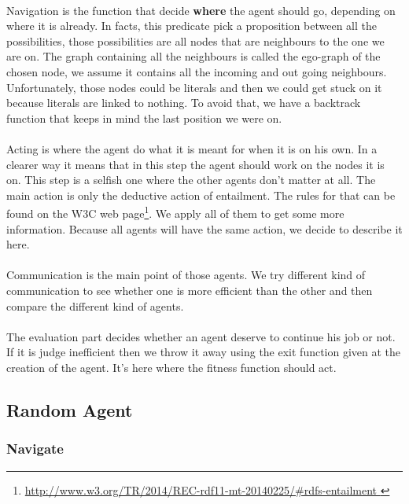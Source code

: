 \documentclass{article}
\begin{document}
		\paragraph{}
			Navigation is the function that decide \textbf{where} the agent should go, depending on where it is already.
			In facts, this predicate pick a proposition between all the possibilities,
			those possibilities are all nodes that are neighbours to the one we are on.
			The graph containing all the neighbours is called the ego-graph of the chosen node,
			we assume it contains all the incoming and out going neighbours.
			Unfortunately, those nodes could be literals and then we could get stuck on it because literals are linked to nothing.
			To avoid that, we have a backtrack function that keeps in mind the last position we were on.
		\paragraph{}
			Acting is where the agent do what it is meant for when it is on his own.
			In a clearer way it means that in this step the agent should work on the nodes it is on.
			This step is a selfish one where the other agents don't matter at all.
			The main action is only the deductive action of entailment.
			The rules for that can be found on the W3C web page\footnote{
				\url{http://www.w3.org/TR/2014/REC-rdf11-mt-20140225/\#rdfs-entailment
			}}.
			We apply all of them to get some more information.
			Because all agents will have the same action, we decide to describe it here.
		\paragraph{}
			Communication is the main point of those agents.
			We try different kind of communication to see whether one is more efficient than the other
			and then compare the different kind of agents.
		\paragraph{}
			The evaluation part decides whether an agent deserve to continue his job or not.
			If it is judge inefficient then we throw it away using the exit function given at the creation of the agent.
			It's here where the fitness function should act.
	\subsection{Random Agent}
		\subsubsection{Navigate}
\end{document}
